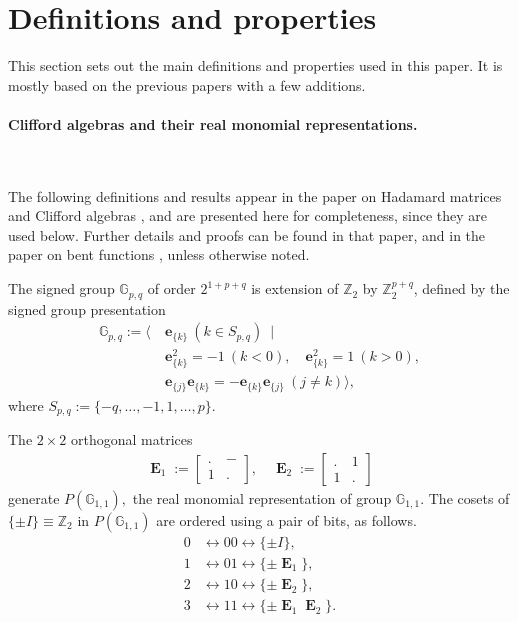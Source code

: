 \documentclass[12pt,a4paper]{article}
\newcommand{\mb}[1]{\mathbb{#1}}
\newcommand{\mf}[1]{\mathbf{#1}}
\newcommand{\oE}{\mf{\operatorname{E}}}
\newcommand{\G}{\mb{G}}
\newcommand{\Z}{\mb{Z}}
\newcommand{\Rep}{P}
\begin{document}
\section{Definitions and properties}
\label{sec-Preliminaries}
This section sets out the main definitions and properties used in this paper.
It is mostly based on the previous papers \cite{Leo14Constructions, Leo15Twin}
with a few additions.

\paragraph*{Clifford algebras and their real monomial representations.}
\label{sec-Clifford}

~

The following definitions and results appear in the paper on Hada\-mard matrices and Clifford algebras \cite{Leo14Constructions},
and are presented here for completeness, since they are used below. 
Further details and proofs can be found in that paper, and in the paper on bent functions \cite{Leo15Twin},
unless otherwise noted.

The signed group
$\G_{p,q}$ of order $2^{1+p+q}$ 
is extension of $\Z_2$ by $\Z_2^{p+q}$,
defined by the signed group presentation
%
\begin{align*}
\G_{p,q} := \bigg\langle \ 
&\mf{e}_{\{k\}}\ (k \in S_{p,q})\ \mid
\\
&\mf{e}_{\{k\}}^2 = -1\ (k < 0), \quad \mf{e}_{\{k\}}^2 = 1\ (k > 0),
\\
&\mf{e}_{\{j\}}\mf{e}_{\{k\}} = -\mf{e}_{\{k\}}\mf{e}_{\{j\}}\ (j \neq k) \bigg\rangle,
\end{align*}
%
where $S_{p,q} := \{-q,\ldots,-1,1,\ldots,p\}.$
% 

The $2 \times 2$ orthogonal matrices
\begin{align*}
\oE_1 :=
\left[
\begin{array}{cc}
. & - \\
1 & .
\end{array}
\right],
\quad
\oE_2 :=
\left[
\begin{array}{cc}
. & 1 \\
1 & .
\end{array}
\right]
\end{align*}
generate $\Rep(\G_{1,1}),$ the real monomial representation of group $\G_{1,1}.$
The cosets of $\{\pm I\} \equiv \Z_2$ in $\Rep(\G_{1,1})$ are
ordered using a pair of bits, as follows.
\begin{align*}
0 &\leftrightarrow 00 \leftrightarrow \{ \pm I \},
\\
1 &\leftrightarrow 01 \leftrightarrow \{ \pm \oE_1 \},
\\
2 &\leftrightarrow 10 \leftrightarrow \{ \pm \oE_2 \},
\\
3 &\leftrightarrow 11 \leftrightarrow \{ \pm \oE_1 \oE_2 \}.
\end{align*}
\end{document}

